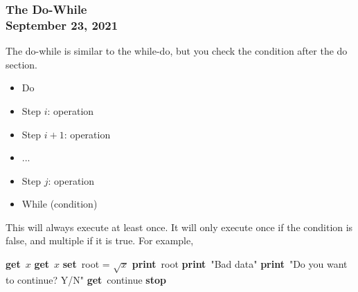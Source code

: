 \documentclass[]{article}
\newcommand{\Get}{\State \textbf{get}~}
\newcommand{\Set}{\State \textbf{set}~}
\newcommand{\Print}{\State \textbf{print}~}
\newcommand{\Stop}{\State \textbf{stop}~}
\begin{document}
\subsubsection{The Do-While\\ {\normalfont September 23, 2021}}
\bigbreak

The do-while is similar to the while-do, but you check the condition after the do section.

\begin{itemize}
	\item Do \setlength{\itemindent}{0.5cm}
	\item Step $i$: operation
	\item Step $i + 1$: operation
	\item ...
	\item Step $j$: operation
	\setlength{\itemindent}{0cm}\item While (condition)\smallskip
\end{itemize}

This will always execute at least once. It will only execute once if the condition is false, and multiple if it is true. For example,

\begin{algorithm}
	\caption{\\Read a var $x$, print $\sqrt{x}$ and repeat the process as long as requested by user.}
	\begin{algorithmic}[1]
		\Get $x$
		\Do
			\Get $x$
				\Set root = $\sqrt{x}$
				\Print root
			\Else
				\Print "Bad data"
			\EndIf
			\Print "Do you want to continue? Y/N"
			\Get continue
		\Stop
	\end{algorithmic}
\end{algorithm}
\end{document}
